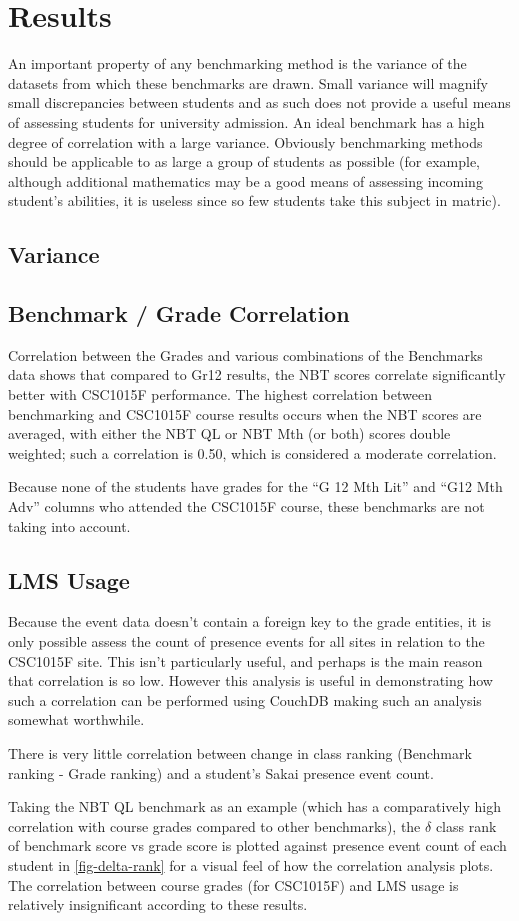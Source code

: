 \section{Results}
An important property of any benchmarking method is the variance of the datasets from which these benchmarks are drawn. Small variance will magnify small discrepancies between students and as such does not provide a useful means of assessing students for university admission. An ideal benchmark has a high degree of correlation with a large variance. Obviously benchmarking methods should be applicable to as large a group of students as possible (for example, although additional mathematics may be a good means of assessing incoming student's abilities, it is useless since so few students take this subject in matric).

\subsection{Variance}

\subsection{Benchmark / Grade Correlation}
Correlation between the Grades and various combinations of the Benchmarks data shows that compared to Gr12 results, the NBT scores correlate significantly better with CSC1015F performance. The highest correlation between benchmarking and CSC1015F course results occurs when the NBT scores are averaged, with either the NBT QL or NBT Mth (or both) scores double weighted; such a correlation is 0.50, which is considered a moderate correlation.

Because none of the students have grades for the ``G 12 Mth Lit'' and ``G12 Mth Adv'' columns who attended the CSC1015F course, these benchmarks are not taking into account.

\subsection{LMS Usage}
Because the event data doesn't contain a foreign key to the grade entities, it is only possible assess the count of presence events for all sites in relation to the CSC1015F site. This isn't particularly useful, and perhaps is the main reason that correlation is so low. However this analysis is useful in demonstrating how such a correlation can be performed using CouchDB making such an analysis somewhat worthwhile.


There is very little correlation between change in class ranking (Benchmark ranking - Grade ranking) and a student's Sakai presence event count.

Taking the NBT QL benchmark as an example (which has a comparatively high correlation with course grades compared to other benchmarks), the \( \delta \) class rank of benchmark score vs grade score is plotted against presence event count of each student in \ref{fig-delta-rank} for a visual feel of how the correlation analysis plots. The correlation between course grades (for CSC1015F) and LMS usage is relatively insignificant according to these results.

